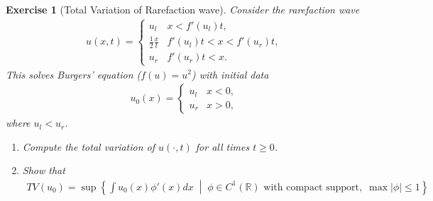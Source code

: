 \documentclass[10pt,letterpaper]{article}
\theoremstyle{break}
\newtheorem{exercise}{Exercise}
\begin{document}
\title{}
\date{}

\maketitle





























\begin{exercise}[Total Variation of Rarefaction wave]
    Consider the rarefaction wave 
    \begin{align}
     u(x,t)
     = 
     \left\{
     \begin{array}{ll}
        u_l & x < f'(u_l) t,
        \\
        \frac 1 2 \frac x t & f'(u_l)t < x < f'(u_r)t,
        \\
        u_r & f'(u_r)t < x.
     \end{array}
     \right.
    \end{align}
    This solves Burgers' equation ($f(u)=u^2$) with initial data 
    \begin{align}
     u_{0}(x)
     = 
     \left\{
     \begin{array}{cc}
        u_l & x < 0,
        \\
        u_r & x > 0,
     \end{array}
     \right.
    \end{align}
    where $u_l < u_r$. 
    \begin{enumerate}
     \item Compute the total variation of $u(\cdot,t)$ for all times $t \geq 0$.
     \item Show that
     \begin{align}
      TV(u_{0}) = \sup\left\{ \int u_0(x) \phi'(x) dx \;\middle|\; \phi \in C^{1}(\mathbb R) \text{ with compact support}, \; \max |\phi| \leq 1 \right\}
     \end{align}
    \end{enumerate}
\end{exercise}
\end{document}
